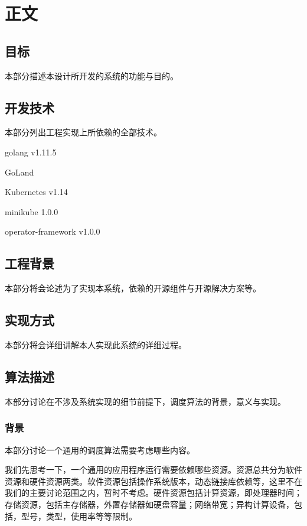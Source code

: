 
\section{正文}

\subsection{目标}

本部分描述本设计所开发的系统的功能与目的。

\subsection{开发技术}

本部分列出工程实现上所依赖的全部技术。

golang v1.11.5

GoLand

Kubernetes v1.14

minikube 1.0.0

operator-framework v1.0.0

\subsection{工程背景}

本部分将会论述为了实现本系统，依赖的开源组件与开源解决方案等。

\subsection{实现方式}

本部分将会详细讲解本人实现此系统的详细过程。

\subsection{算法描述}

本部分讨论在不涉及系统实现的细节前提下，调度算法的背景，意义与实现。

\subsubsection{背景}

本部分讨论一个通用的调度算法需要考虑哪些内容。

我们先思考一下，一个通用的应用程序运行需要依赖哪些资源。资源总共分为软件资源和硬件资源两类。软件资源包括操作系统版本，动态链接库依赖等，这里不在我们的主要讨论范围之内，暂时不考虑。硬件资源包括计算资源，即处理器时间；存储资源，包括主存储器，外置存储器如硬盘容量；网络带宽；异构计算设备，包括，型号，类型，使用率等等限制。

